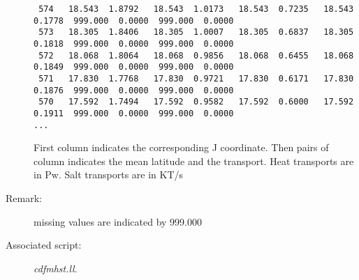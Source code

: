\documentclass[a4paper,11pt]{article}
\begin{document}
\begin{description}
\begin{scriptsize}
\begin{verbatim}
 574   18.543  1.8792   18.543  1.0173   18.543  0.7235   18.543  0.1778  999.000  0.0000  999.000  0.0000
 573   18.305  1.8406   18.305  1.0007   18.305  0.6837   18.305  0.1818  999.000  0.0000  999.000  0.0000
 572   18.068  1.8064   18.068  0.9856   18.068  0.6455   18.068  0.1849  999.000  0.0000  999.000  0.0000
 571   17.830  1.7768   17.830  0.9721   17.830  0.6171   17.830  0.1876  999.000  0.0000  999.000  0.0000
 570   17.592  1.7494   17.592  0.9582   17.592  0.6000   17.592  0.1911  999.000  0.0000  999.000  0.0000
...
\end{verbatim}
\end{scriptsize}
First column indicates the corresponding J coordinate. Then pairs of column indicates the mean latitude and
the transport. Heat transports are in Pw. Salt transports are in KT/s

\item[Remark:]  missing values are indicated by 999.000
\item[Associated script:] {\em cdfmhst.ll}. 
\end{description}

\newpage
\end{document}
